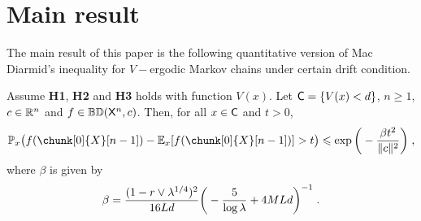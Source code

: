 \documentclass[leqno,11pt,a4paper]{article}
\begin{document}
\section{Main result}\label{sec:Main}
The main result of this paper  is the following quantitative version of Mac Diarmid's inequality for $V-$ergodic Markov chains under certain drift condition.
\begin{theorem}\label{thm:ConcMarkVErgodic}
 Assume {\bf H1}, {\bf H2} and {\bf H3} holds with function $V(x)$. Let $\mathsf{C} = \{V(x) < d\}$, $n\geqslant 1$, $c\in \mathbb{R}^n$ and  $f\in \mathbb{BD}(\mathsf{X}^n,c)$. Then, for all $x\in \mathsf{C}$ and $t > 0$,
 \[
\Pbb_x\big(f( \chunk[0]{X}[n-1])-\Ebb_x[f(\chunk[0]{X}[n-1])]>t\big)\leqslant \exp\bigg(-\frac{\beta t^2}{\|c\|^2}\bigg)\eqsp,
 \]
where $\beta$ is given by
 \[
 \beta=\frac{(1-r\vee \lambda^{1/4})^2}{16Ld}\bigg(-\frac5{\log \lambda}+4MLd\bigg)^{-1}\;.
 \]
\end{theorem}
\end{document}
